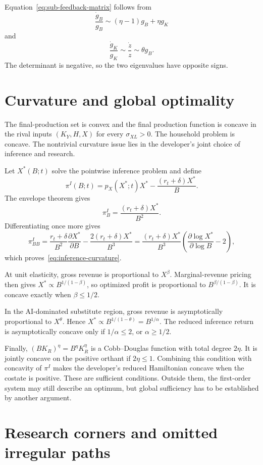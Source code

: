 Equation~\eqref{eq:sub-feedback-matrix} follows from
\[
 \frac{\dot g_B}{g_B}
 \sim(\eta-1)g_B+\eta g_K
\]
and
\[
 \frac{\dot g_K}{g_K}
 \sim\frac{\dot z}{z}\sim\theta g_B.
\]
The determinant is negative, so the two eigenvalues have opposite signs.

\section{Curvature and global optimality}
\label{app:curvature}

The final-production set is convex and the final production function is concave in the rival inputs $(K_Y,H,X)$ for every $\sigma_{XL}>0$. The household problem is concave. The nontrivial curvature issue lies in the developer's joint choice of inference and research.

Let $X^*(B;t)$ solve the pointwise inference problem and define
\[
 \pi^I(B;t)=p_X(X^*;t)X^*
 -\frac{(r_t+\delta)X^*}{B}.
\]
The envelope theorem gives
\[
 \pi^I_B=\frac{(r_t+\delta)X^*}{B^2}.
\]
Differentiating once more gives
\[
 \pi^I_{BB}
 =\frac{r_t+\delta}{B^2}\frac{\partial X^*}{\partial B}
 -\frac{2(r_t+\delta)X^*}{B^3}
 =\frac{(r_t+\delta)X^*}{B^3}
 \left(\frac{\partial\log X^*}{\partial\log B}-2\right),
\]
which proves~\eqref{eq:inference-curvature}.

At unit elasticity, gross revenue is proportional to $X^\beta$. Marginal-revenue pricing then gives
$X^*\propto B^{1/(1-\beta)}$, so optimized profit is proportional to
$B^{\beta/(1-\beta)}$. It is concave exactly when $\beta\leq1/2$.

In the AI-dominated substitute region, gross revenue is asymptotically proportional to $X^\theta$. Hence
$X^*\propto B^{1/(1-\theta)}=B^{1/\alpha}$.
The reduced inference return is asymptotically concave only if
$1/\alpha\leq2$, or $\alpha\geq1/2$.

Finally, $(BK_R)^\eta=B^\eta K_R^\eta$ is a Cobb--Douglas function with total degree $2\eta$. It is jointly concave on the positive orthant if $2\eta\leq1$. Combining this condition with concavity of $\pi^I$ makes the developer's reduced Hamiltonian concave when the costate is positive. These are sufficient conditions. Outside them, the first-order system may still describe an optimum, but global sufficiency has to be established by another argument.

\section{Research corners and omitted irregular paths}
\label{app:corners}

